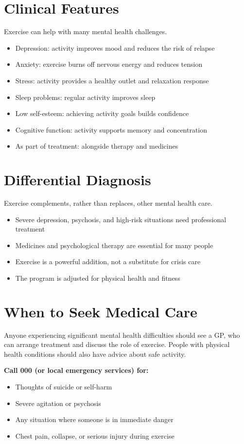 \section*{Clinical Features}
Exercise can help with many mental health challenges.
\begin{itemize}
    \item Depression: activity improves mood and reduces the risk of relapse
    \item Anxiety: exercise burns off nervous energy and reduces tension
    \item Stress: activity provides a healthy outlet and relaxation response
    \item Sleep problems: regular activity improves sleep
    \item Low self-esteem: achieving activity goals builds confidence
    \item Cognitive function: activity supports memory and concentration
    \item As part of treatment: alongside therapy and medicines
\end{itemize}

\section*{Differential Diagnosis}
Exercise complements, rather than replaces, other mental health care.
\begin{itemize}
    \item Severe depression, psychosis, and high-risk situations need professional treatment
    \item Medicines and psychological therapy are essential for many people
    \item Exercise is a powerful addition, not a substitute for crisis care
    \item The program is adjusted for physical health and fitness
\end{itemize}

\section*{When to Seek Medical Care}
Anyone experiencing significant mental health difficulties should see a GP, who can arrange treatment and discuss the role of exercise. People with physical health conditions should also have advice about safe activity.

\textbf{Call 000 (or local emergency services) for:}
\begin{itemize}
    \item Thoughts of suicide or self-harm
    \item Severe agitation or psychosis
    \item Any situation where someone is in immediate danger
    \item Chest pain, collapse, or serious injury during exercise
\end{itemize}

